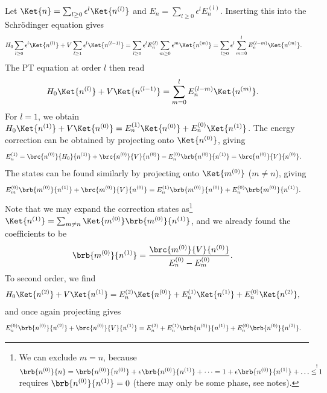 \documentclass[english, parskip=full]{scrbook}
\begin{document}
Let $\Ket{n} = \sum_{l\ge 0} \epsilon^l \Ket{n^{(l)}}$ and $E_n = \sum_{l\ge 0} \epsilon^l E_n^{(l)}$.
Inserting this into the Schrödinger equation gives
\begin{align}
H_0\sum_{l\ge 0} \epsilon^l \Ket{n^{(l)}} + V \sum_{l\ge 1} \epsilon^{l} \Ket{n^{(l-1)}} &=  \sum_{l\ge 0} \epsilon^l E_n^{(l)} \sum_{m\ge 0} \epsilon^m \Ket{n^{(m)}} = \sum_{l\ge 0} \epsilon^l \sum_{m=0}^l E_n^{(l-m)} \Ket{n^{(m)}}.
\end{align}
The PT equation at order $l$ then read
\begin{align}
H_0\Ket{n^{(l)}} + V\Ket{n^{(l-1)}} &= \sum_{m=0}^l E_n^{(l-m)} \Ket{n^{(m)}}.
\end{align}
For $l=1$, we obtain $H_0 \Ket{n^{(1)}} + V\Ket{n^{(0)}} = E_n^{(1)} \Ket{n^{(0)}} + E_n^{(0)} \Ket{n^{(1)}}$.
The energy correction can be obtained by projecting onto $\Ket{n^{(0)}}$, giving
\begin{align}
E_n^{(1)} &= \brc{n^{(0)}}{H_0}{n^{(1)}} + \brc{n^{(0)}}{V}{n^{(0)}} - E_n^{(0)} \brb{n^{(0)}}{n^{(1)}} = \brc{n^{(0)}}{V}{n^{(0)}}.
\end{align}
The states can be found similarly by projecting onto $\Ket{m^{(0)}}$ ($m\neq n$), giving
\begin{align}
E_m^{(0)} \brb{m^{(0)}}{n^{(1)}} + \brc{m^{(0)}}{V}{n^{(0)}} &= E_n^{(1)} \brb{m^{(0)}}{n^{(0)}} + E_n^{(0)} \brb{m^{(0)}}{n^{(1)}}.
\end{align}
Note that we may expand the correction states as\footnote{We can exclude $m=n$, because $\brb{n^{(0)}}{n} = \brb{n^{(0)}}{n^{(0)}} + \epsilon \brb{n^{(0)}}{n^{(1)}} + \dots = 1 + \epsilon \brb{n^{(0)}}{n^{(1)}} + \dots \overset{!}{\le 1}$ requires $\brb{n^{(0)}}{n^{(1)}} = 0$ (there may only be some phase, see notes).} $\Ket{n^{(1)}} = \sum_{m\neq n} \Ket{m^{(0)}} \brb{m^{(0)}}{n^{(1)}}$, and we already found the coefficients to be
\begin{align}
\brb{m^{(0)}}{n^{(1)}} &= \frac{\brc{m^{(0)}}{V}{n^{(0)}}}{E_n^{(0)} - E_m^{(0)}}.
\end{align}
To second order, we find
\begin{align}
H_0\Ket{n^{(2)}} + V\Ket{n^{(1)}} &= E_n^{(2)} \Ket{n^{(0)}} + E_n^{(1)} \Ket{n^{(1)}} + E_n^{(0)} \Ket{n^{(2)}},
\end{align}
and once again projecting gives
\begin{align}
E_n^{(0)} \brb{n^{(0)}}{n^{(2)}} + \brc{n^{(0)}}{V}{n^{(1)}} &= E_n^{(2)} + E_n^{(1)} \brb{n^{(0)}}{n^{(1)}} + E_n^{(0)} \brb{n^{(0)}}{n^{(2)}}.
\end{align}
\end{document}
